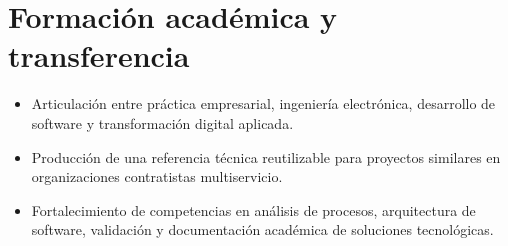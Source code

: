 \section*{Formación académica y transferencia}
\begin{itemize}
  \item Articulación entre práctica empresarial, ingeniería electrónica, desarrollo de software y transformación digital aplicada.
  \item Producción de una referencia técnica reutilizable para proyectos similares en organizaciones contratistas multiservicio.
  \item Fortalecimiento de competencias en análisis de procesos, arquitectura de software, validación y documentación académica de soluciones tecnológicas.
\end{itemize}
